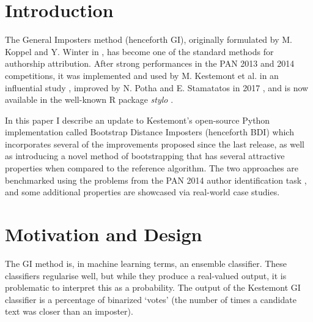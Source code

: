 \documentclass[
    hf
]{ceurart}
\begin{document}
\maketitle

\section{Introduction}

The General Imposters method (henceforth GI), originally formulated by M. Koppel
and Y. Winter in \cite{koppel_gi}, has become one of the standard
methods for authorship attribution. After strong performances in the PAN 2013 and
2014 competitions, it was implemented and used by M. Kestemont et al. in an
influential study \cite{kestemont_caesar}, improved by N. Potha and E.
Stamatatos in 2017 \cite{potha_improved_gi}, and is now available in the
well-known R package \emph{stylo} \cite{stylo}.

In this paper I describe an update to Kestemont's open-source Python
implementation \cite{kestemont_ruzicka} called Bootstrap Distance Imposters (henceforth BDI) which
incorporates several of the improvements proposed since the last release, as
well as introducing a novel method of bootstrapping that has several attractive
properties when compared to the reference algorithm. The two approaches are
benchmarked using the problems from the PAN 2014 author identification task
\cite{pan_2014}, and some additional properties are showcased via real-world
case studies.

\section{Motivation and Design}

The GI method is, in machine learning terms, an ensemble classifier. These
classifiers regularise well, but while they produce a real-valued output, it is
problematic to interpret this as a probability. The output of the Kestemont GI
classifier is a percentage of binarized `votes' (the number of times a candidate
text was closer than an imposter).
\end{document}
